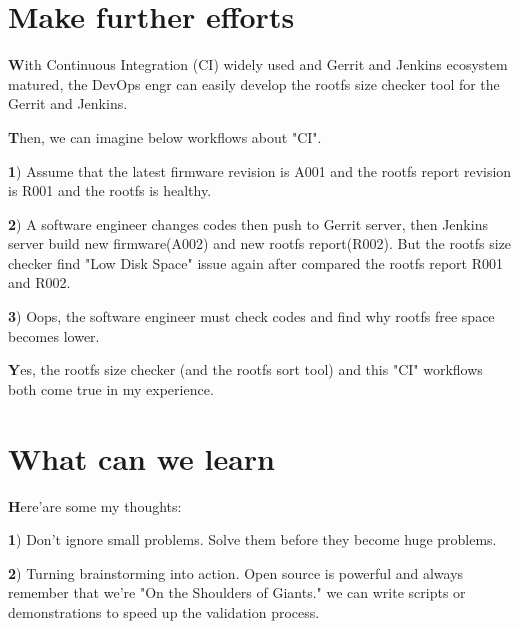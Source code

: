 \documentclass{article}
\begin{document}
\section{Make further efforts}

\textbf
With Continuous Integration (CI) widely used and Gerrit and Jenkins ecosystem matured, the DevOps engr can easily develop the rootfs size checker tool for the Gerrit and Jenkins.

\textbf
Then, we can imagine below workflows about "CI".

\textbf
1) Assume that the latest firmware revision is A001 and the rootfs report revision is R001 and the rootfs is healthy.

\textbf
2) A software engineer changes codes then push to Gerrit server, then Jenkins server build new firmware(A002) and new rootfs report(R002). But the rootfs size checker find "Low Disk Space" issue again after compared the rootfs report R001 and R002.

\textbf
3) Oops, the software engineer must check codes and find why rootfs free space becomes lower.

\textbf
Yes, the rootfs size checker (and the rootfs sort tool) and this "CI" workflows both come true in my experience.


\section{What can we learn}

\textbf
Here'are some my thoughts:

\textbf
1) Don't ignore small problems. Solve them before they become huge problems.


\textbf
2) Turning brainstorming into action. Open source is powerful and always remember that we're "On the Shoulders of Giants."
we can write scripts or demonstrations to speed up the validation process.
\end{document}
